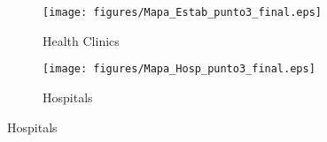 \documentclass[12pt]{article}
\begin{document}
\begin{spacing}{1.4}
\begin{figure}[htpb!]
  \begin{center}
    \caption{Geographic Distribution of Health Centres and Hospitals}
    \label{fig:healthgeo}
    \begin{subfigure}{.5\textwidth}
      \centering
      \texttt{[image: figures/Mapa\_Estab\_punto3\_final.eps]}
      \caption{Health Clinics}
      \label{fig:ests}
    \end{subfigure}%
    \begin{subfigure}{.5\textwidth}
      \centering
      \texttt{[image: figures/Mapa\_Hosp\_punto3\_final.eps]}
      \caption{Hospitals}
      \label{fig:hosps}
    \end{subfigure}
  \end{center}
\end{figure}



\end{spacing}
\end{document}

